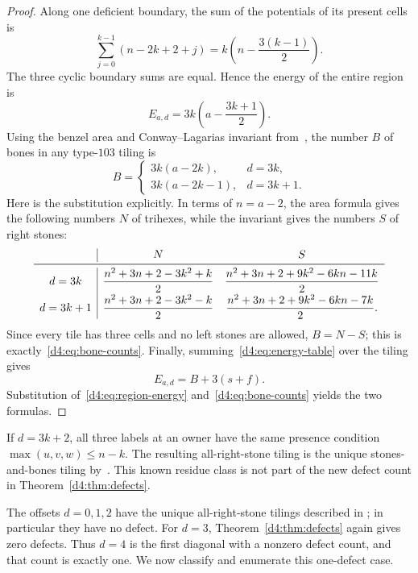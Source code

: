 \begin{proof}
Along one deficient boundary, the sum of the potentials of its present cells
is
\[
 \sum_{j=0}^{k-1}(n-2k+2+j)
   =k\left(n-\frac{3(k-1)}2\right).
\]
The three cyclic boundary sums are equal.  Hence the energy of the entire
region is
\begin{equation}\label{d4:eq:region-energy}
 E_{a,d}=3k\left(a-\frac{3k+1}{2}\right).
\end{equation}
Using the benzel area and Conway--Lagarias invariant from~\cite{DLPY}, the
number $B$ of bones in any type-$103$ tiling is
\begin{equation}\label{d4:eq:bone-counts}
 B=\begin{cases}
 3k(a-2k),&d=3k,\\
 3k(a-2k-1),&d=3k+1.
 \end{cases}
\end{equation}
Here is the substitution explicitly.  In terms of $n=a-2$, the area formula
gives the following numbers $N$ of trihexes, while the invariant gives the
numbers $S$ of right stones:
\[
\begin{array}{c|cc}
 &N&S\\ \midrule
d=3k
 &\dfrac{n^2+3n+2-3k^2+k}{2}
 &\dfrac{n^2+3n+2+9k^2-6kn-11k}{2}\\[5pt]
d=3k+1
 &\dfrac{n^2+3n+2-3k^2-k}{2}
 &\dfrac{n^2+3n+2+9k^2-6kn-7k}{2}.
\end{array}
\]
Since every tile has three cells and no left stones are allowed, $B=N-S$;
this is exactly~\eqref{d4:eq:bone-counts}.  Finally,
summing~\eqref{d4:eq:energy-table} over the tiling gives
\[
 E_{a,d}=B+3(s+f).
\]
Substitution of~\eqref{d4:eq:region-energy} and~\eqref{d4:eq:bone-counts} yields
the two formulas.
\end{proof}

\begin{remark}
If $d=3k+2$, all three labels at an owner have the same presence condition
$\max(u,v,w)\le n-k$.  The resulting all-right-stone tiling is the unique
stones-and-bones tiling by~\cite[Theorem~1.1]{DLPY}.  This known residue class
is not part of the new defect count in Theorem~\ref{d4:thm:defects}.
\end{remark}

The offsets $d=0,1,2$ have the unique all-right-stone tilings described in
\cite[Theorem~1.1 and Remark~5.1]{DLPY}; in particular they have no defect.
For $d=3$, Theorem~\ref{d4:thm:defects} again gives zero defects.  Thus $d=4$
is the first diagonal with a nonzero defect count, and that count is exactly
one.  We now classify and enumerate this one-defect case.

